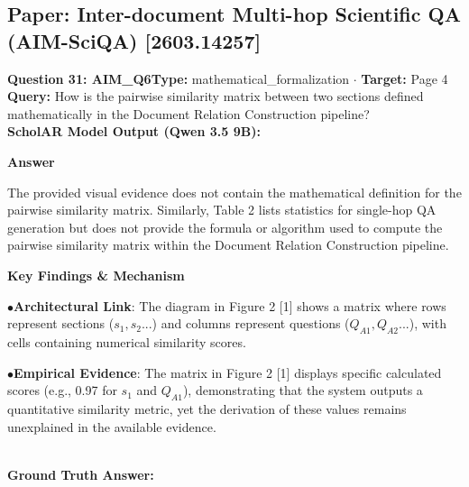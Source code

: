 \documentclass[10pt,a4paper]{article}
\begin{document}
\subsection{Paper: Inter-document Multi-hop Scientific QA (AIM-SciQA) [2603.14257]}
\vspace{-4pt}
\begin{tcolorbox}[questionbox]
{\noindent\bfseries\large\color{navy} Question 31: AIM\_Q6}\hfill {\footnotesize\color{darkteal}\textbf{Type:} mathematical\_formalization $\cdot$ \textbf{Target:} Page 4}\\[4pt]
{\noindent\bfseries\color{accentblue} Query: } How is the pairwise similarity matrix between two sections defined mathematically in the Document Relation Construction pipeline?\\[6pt]
{\noindent\bfseries\color{navy} ScholAR Model Output (Qwen 3.5 9B):}\\[2pt]
{\small \noindent \textbf{Answer}\par\vspace{3pt}The provided visual evidence does not contain the mathematical definition for the pairwise similarity matrix.  Similarly, Table 2 lists statistics for single-hop QA generation but does not provide the formula or algorithm used to compute the pairwise similarity matrix within the Document Relation Construction pipeline.\par\vspace{3pt}\noindent \textbf{Key Findings \& Mechanism}\par\vspace{3pt}\noindent\hspace*{8pt}$\bullet$\hspace*{4pt}\textbf{Architectural Link}: The diagram in Figure 2 [1] shows a matrix where rows represent sections ($s_1, s_2...$) and columns represent questions ($Q_{A1}, Q_{A2}...$), with cells containing numerical similarity scores.\par\vspace{3pt}\noindent\hspace*{8pt}$\bullet$\hspace*{4pt}\textbf{Empirical Evidence}: The matrix in Figure 2 [1] displays specific calculated scores (e.g., 0.97 for $s_1$ and $Q_{A1}$), demonstrating that the system outputs a quantitative similarity metric, yet the derivation of these values remains unexplained in the available evidence.}\\[6pt]
{\noindent\bfseries\color{darkteal} Ground Truth Answer:}\\[2pt]

\end{tcolorbox}
\end{document}
